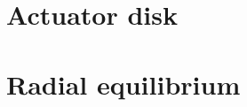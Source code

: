 \section{Actuator disk}
\label{sec:actuatorDisk}

\section{Radial equilibrium}
\label{sec:radialEquilibrium}


